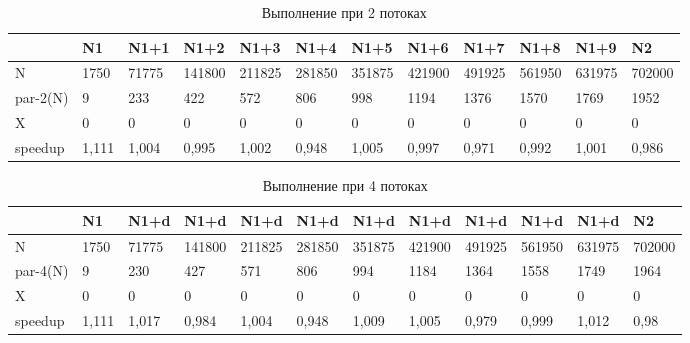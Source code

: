 \documentclass[a4paper,14pt,russian]{extarticle}
\begin{document}
\begin{table}[H]
	\caption{Выполнение при 2 потоках}
	\label{clang-2}
	\begin{adjustbox}{width=\textwidth,nofloat=table}
		\begin{tabular}{|l|l|l|l|l|l|l|l|l|l|l|l|}
			\hline
			& N1   & N1+1  & N1+2   & N1+3   & N1+4   & N1+5   & N1+6   & N1+7   & N1+8   & N1+9   & N2     \\\hline
N        & 1750  & 71775 & 141800 & 211825 & 281850 & 351875 & 421900 & 491925 & 561950 & 631975 & 702000 \\ \hline
par-2(N) & 9     & 233   & 422    & 572    & 806    & 998    & 1194   & 1376   & 1570   & 1769   & 1952   \\ \hline
X        & 0     & 0     & 0      & 0      & 0      & 0      & 0      & 0      & 0      & 0      & 0      \\ \hline
speedup  & 1,111 & 1,004 & 0,995  & 1,002  & 0,948  & 1,005  & 0,997  & 0,971  & 0,992  & 1,001  & 0,986  \\ \hline
		\end{tabular}
	\end{adjustbox}
\end{table}

\begin{table}[H]
	\caption{Выполнение при 4 потоках}
	\label{clang-4}
	\begin{adjustbox}{width=\textwidth,nofloat=table}
		\begin{tabular}{|l|l|l|l|l|l|l|l|l|l|l|l|}
			\hline
			& N1    & N1+d  & N1+d   & N1+d   & N1+d   & N1+d   & N1+d   & N1+d   & N1+d   & N1+d   & N2     \\ \hline
N        & 1750  & 71775 & 141800 & 211825 & 281850 & 351875 & 421900 & 491925 & 561950 & 631975 & 702000 \\ \hline
par-4(N) & 9     & 230   & 427    & 571    & 806    & 994    & 1184   & 1364   & 1558   & 1749   & 1964   \\ \hline
X        & 0     & 0     & 0      & 0      & 0      & 0      & 0      & 0      & 0      & 0      & 0      \\ \hline
speedup  & 1,111 & 1,017 & 0,984  & 1,004  & 0,948  & 1,009  & 1,005  & 0,979  & 0,999  & 1,012  & 0,98   \\ \hline
		\end{tabular}
	\end{adjustbox}
\end{table}
\end{document}
